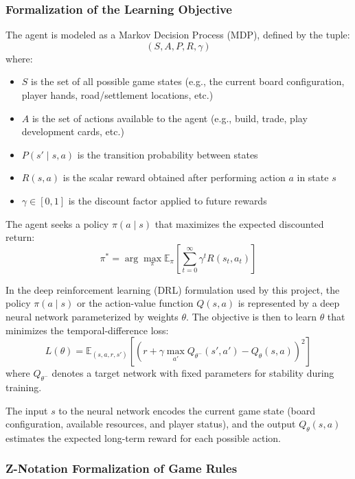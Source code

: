 \documentclass{article}
\begin{document}
\subsubsection{Formalization of the Learning Objective}
\label{sec:formalization}

The \RL{} agent is modeled as a Markov Decision Process (MDP), defined by the tuple:
\[
(S, A, P, R, \gamma)
\]
where:
\begin{itemize}
    \item $S$ is the set of all possible game states (e.g., the current board configuration, player hands, road/settlement locations, etc.)
    \item $A$ is the set of actions available to the agent (e.g., build, trade, play development cards, etc.)
    \item $P(s' \mid s, a)$ is the transition probability between states
    \item $R(s, a)$ is the scalar reward obtained after performing action $a$ in state $s$
    \item $\gamma \in [0, 1]$ is the discount factor applied to future rewards
\end{itemize}

The agent seeks a policy $\pi(a \mid s)$ that maximizes the expected discounted return:
\[
\pi^* = \arg\max_{\pi} \mathbb{E}_{\pi}\left[\sum_{t=0}^{\infty} \gamma^t R(s_t, a_t)\right]
\]

In the deep reinforcement learning (DRL) formulation used by this project, the policy $\pi(a \mid s)$ or the action-value function $Q(s, a)$ is represented by a deep neural network parameterized by weights $\theta$. The objective is then to learn $\theta$ that minimizes the temporal-difference loss:
\[
L(\theta) = \mathbb{E}_{(s, a, r, s')} \left[ \left( r + \gamma \max_{a'} Q_{\theta^-}(s', a') - Q_{\theta}(s, a) \right)^2 \right]
\]
where $Q_{\theta^-}$ denotes a target network with fixed parameters for stability during training.

The input $s$ to the neural network encodes the current game state (board configuration, available resources, and player status), and the output $Q_{\theta}(s, a)$ estimates the expected long-term reward for each possible action.

\subsubsection{Z-Notation Formalization of Game Rules}
\label{sec:math-formalization}
\end{document}
